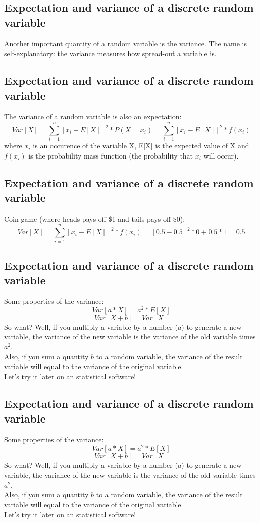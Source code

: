 \documentclass[11pt]{article}
\begin{document}
	\subsection*{Expectation and variance of a discrete random variable}
	Another important quantity of a random variable is the variance. The name is self-explanatory: the variance measures how spread-out a variable is.

	\subsection*{Expectation and variance of a discrete random variable}
	The variance of a random variable is also an expectation:
		\[Var[X] = \sum\limits_{i=1}^n[x_i - E[X]]^2 * P(X=x_i) =\sum\limits_{i=1}^n[x_i - E[X]]^2 * f(x_i)\]
where $x_i$ is an occurence of the variable X, E[X] is the expected value of X and $f(x_i)$ is the probability mass function (the probability that $x_i$ will occur).

	\subsection*{Expectation and variance of a discrete random variable}
	Coin game (where heads pays off \$1 and tails pays off \$0):
	\[Var[X] = \sum\limits_{i=1}^n[x_i - E[X]]^2 * f(x_i) = [0.5 - 0.5]^2 * 0 + 0.5 * 1 = 0.5\]


	\subsection*{Expectation and variance of a discrete random variable}
	Some properties of the variance:
	\[Var[a*X] = a^2 * E[X]\]
	\[Var[X+ b] = Var[X]\]
	So what? Well, if you multiply a variable by a number ($a$) to generate a new variable, the variance of the new variable is the variance of the old variable times $a^2$.
	\newline\\Also, if you sum a quantity $b$ to a random variable, the variance of the result variable will equal to the variance of the original variable.
	\newline\\Let's try it later on an statistical software!

	\subsection*{Expectation and variance of a discrete random variable}
	Some properties of the variance:
	\[Var[a*X] = a^2 * E[X]\]
	\[Var[X+ b] = Var[X]\]
	So what? Well, if you multiply a variable by a number ($a$) to generate a new variable, the variance of the new variable is the variance of the old variable times $a^2$.
	\newline\\Also, if you sum a quantity $b$ to a random variable, the variance of the result variable will equal to the variance of the original variable.
	\newline\\Let's try it later on an statistical software!
\end{document}
